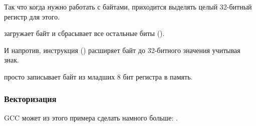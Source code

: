 Так что когда нужно работать с байтами, приходится выделять целый 32-битный регистр для этого.

 загружает байт и сбрасывает все остальные биты ().

И напротив, инструкция  () расширяет байт до 32-битного значения учитывая знак.

 просто записывает байт из младших 8 бит регистра в память.

\subsubsection{Векторизация}

\Optimizing GCC может из этого примера сделать намного больше: .
